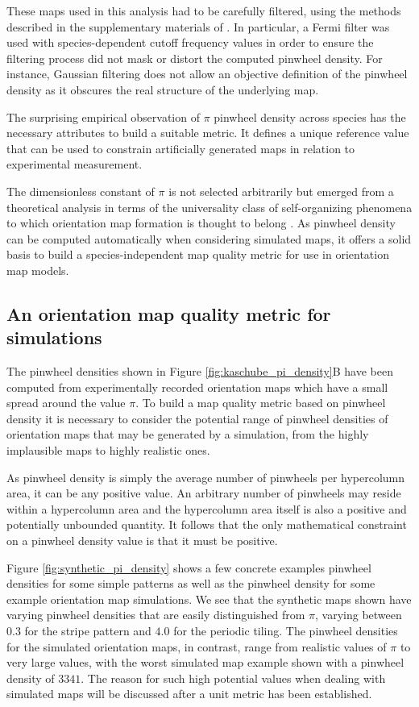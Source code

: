 \documentclass[phd,ianc,twoside]{infthesis}
\begin{document}
These maps used in this analysis had to be carefully filtered, using the
methods described in the supplementary materials of
\citet{kaschube_science10}. In particular, a Fermi filter was used with
species-dependent cutoff frequency values in order to ensure the
filtering process did not mask or distort the computed pinwheel
density. For instance, Gaussian filtering does not allow an objective
definition of the pinwheel density \citep{kaschube_science10} as it
obscures the real structure of the underlying map.

The surprising empirical observation of $\pi$ pinwheel density across
species has the necessary attributes to build a suitable metric. It
defines a unique reference value that can be used to constrain
artificially generated maps in relation to experimental measurement.

The dimensionless constant of $\pi$ is not selected arbitrarily but
emerged from a theoretical analysis in terms of the universality class
of self-organizing phenomena to which orientation map formation is
thought to belong \citep{kaschube_science10}. As pinwheel density can be
computed automatically when considering simulated maps, it offers a
solid basis to build a species-independent map quality metric for use in
orientation map models.

\subsection{An orientation map quality metric for simulations}

The pinwheel densities shown in Figure \ref{fig:kaschube_pi_density}B
have been computed from experimentally recorded orientation maps which
have a small spread around the value $\pi$. To build a map quality
metric based on pinwheel density it is necessary to consider the
potential range of pinwheel densities of orientation maps that may be
generated by a simulation, from the highly implausible maps to highly
realistic ones.

As pinwheel density is simply the average number of pinwheels per
hypercolumn area, it can be any positive value. An arbitrary number of
pinwheels may reside within a hypercolumn area and the hypercolumn area
itself is also a positive and potentially unbounded quantity. It follows
that the only mathematical constraint on a pinwheel density value is
that it must be positive.

Figure \ref{fig:synthetic_pi_density} shows a few concrete examples
pinwheel densities for some simple patterns as well as the pinwheel
density for some example orientation map simulations. We see that the
synthetic maps shown have varying pinwheel densities that are easily
distinguished from $\pi$, varying between $0.3$ for the stripe pattern
and $4.0$ for the periodic tiling. The pinwheel densities for the
simulated orientation maps, in contrast, range from realistic values of
$\pi$ to very large values, with the worst simulated map example shown
with a pinwheel density of $3341$. The reason for such high potential
values when dealing with simulated maps will be discussed after a unit
metric has been established.
\end{document}
